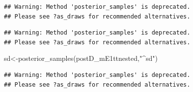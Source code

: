 \documentclass[
  12pt,
]{krantz}
\newenvironment{Shaded}{\begin{snugshade}}{\end{snugshade}}
\newcommand{\DocumentationTok}[1]{\textcolor[rgb]{0.56,0.35,0.01}{\textbf{\textit{#1}}}}
\newcommand{\FunctionTok}[1]{\textcolor[rgb]{0.00,0.00,0.00}{#1}}
\newcommand{\NormalTok}[1]{#1}
\newcommand{\OtherTok}[1]{\textcolor[rgb]{0.56,0.35,0.01}{#1}}
\newcommand{\SpecialCharTok}[1]{\textcolor[rgb]{0.00,0.00,0.00}{#1}}
\newcommand{\StringTok}[1]{\textcolor[rgb]{0.31,0.60,0.02}{#1}}
\theoremstyle{definition}
\theoremstyle{definition}
\theoremstyle{definition}
\theoremstyle{definition}
\theoremstyle{remark}
\begin{document}
\begin{verbatim}
## Warning: Method 'posterior_samples' is deprecated.
## Please see ?as_draws for recommended alternatives.
\end{verbatim}

\begin{Shaded}
\end{Shaded}

\begin{verbatim}
## Warning: Method 'posterior_samples' is deprecated.
## Please see ?as_draws for recommended alternatives.
\end{verbatim}

\begin{Shaded}
\begin{Highlighting}[]
\NormalTok{sd}\OtherTok{\textless{}{-}}\FunctionTok{posterior\_samples}\NormalTok{(postD\_mE1ttnested,}\StringTok{"\^{}sd"}\NormalTok{)}
\end{Highlighting}
\end{Shaded}

\begin{verbatim}
## Warning: Method 'posterior_samples' is deprecated.
## Please see ?as_draws for recommended alternatives.
\end{verbatim}
\end{document}
